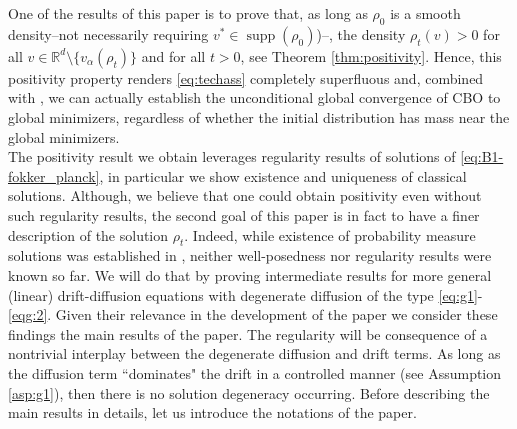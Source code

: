 \documentclass[a4paper, 11pt]{article}
\newcounter{results}[section]
\theoremstyle{plain}
\theoremstyle{remark}
\theoremstyle{definition}
\begin{document}
One of the results of this paper is to prove that, as long as $\rho_0$ is a smooth density--not necessarily requiring $v^* \in \operatorname{supp}(\rho_0)$)--,  the density $\rho_t(v)>0$ for all $v \in \mathbb R^d \setminus \{v_\alpha(\rho_t)\}$ and for all $t>0$, see Theorem \ref{thm:positivity}. Hence, this positivity property renders \eqref{eq:techass} completely superfluous and, combined with \cite[Theorem 3.7, Theorem 3.8]{B1-fornasier2021global}, we can actually establish the { unconditional} global convergence of CBO to global minimizers, regardless of whether the initial distribution has mass near the global minimizers.\\

The positivity result we obtain leverages  regularity results of solutions of \eqref{eq:B1-fokker_planck}, in particular we show existence and uniqueness of classical solutions. Although, we believe that one could obtain positivity even without such regularity results, the second goal of this paper is in fact to have a finer description of the solution $\rho_t$. Indeed, while existence of probability measure solutions was established in \cite{carrillo2018analytical}, neither well-posedness nor regularity results were known so far.
We will do that by proving intermediate results for more general (linear) drift-diffusion equations with degenerate diffusion of the type \eqref{eq:g1}-\eqref{eqg:2}. Given their relevance in the development of the paper we consider these findings the main results of the paper. The regularity will be consequence of a nontrivial interplay between the degenerate diffusion and  drift terms. As long as the diffusion term ``dominates" the drift in a controlled manner (see Assumption \ref{asp:g1}), then there is no solution degeneracy occurring. 
Before describing the main results in details, let us introduce the notations of the paper.

		
		
\end{document}
